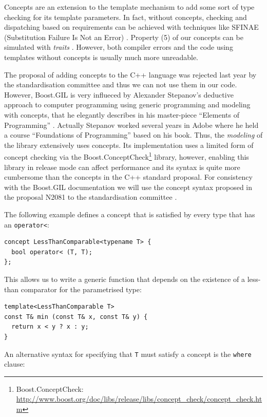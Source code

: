 Concepts are an extension to the template mechanism to add some sort
of type checking for its template parameters. In fact, without
concepts, checking and dispatching based on requirements can be
achieved with techniques like SFINAE (Substitution Failure Is Not an
Error) \cite{vandervoorde08templates}. Property (5) of our concepts
can be simulated with \emph{traits} \cite{c++traits}. However, both
compiler errors and the code using templates without concepts is
usually much more unreadable.

The proposal of adding concepts to the C++ language was rejected last
year by the standardisation committee and thus we can not use them in
our code. However, Boost.GIL is very influeced by Alexander Stepanov's
deductive approach to computer programming using generic programming
and modeling with concepts, that he elegantly describes in his
master-piece ``Elements of Programming''
\cite{stepanov09elements}. Actually Stepanov worked several years in
Adobe where he held a course ``Foundations of Programming'' based on
his book. Thus, the \emph{modeling} of the library extensively uses
concepts. Its implementation uses a limited form of concept checking
via the Boost.ConceptCheck\footnote{
  Boost.ConceptCheck: \url{http://www.boost.org/doc/libs/release/libs/concept_check/concept_check.htm}}
\cite{siek00concept} library, however, enabling this library in
release mode can affect performance and its syntax is quite more
cumbersome than the concepts in the C++ standard proposal. For
consistency with the Boost.GIL documentation we will use the concept
syntax proposed in the proposal N2081 to the standardisation committee
\cite{gregor06concept}.

The following example defines a concept that is satisfied by every
type that has an \texttt{operator<}:

\begin{lstlisting}
concept LessThanComparable<typename T> {
  bool operator< (T, T);
};
\end{lstlisting}

This allows us to write a generic function that depends on the
existence of a less-than comparator for the parametrised type:

\begin{lstlisting}
template<LessThanComparable T>
const T& min (const T& x, const T& y) {
  return x < y ? x : y;
}
\end{lstlisting}

An alternative syntax for specifying that \texttt{T} must satisfy a
concept is the \texttt{where} clause:

